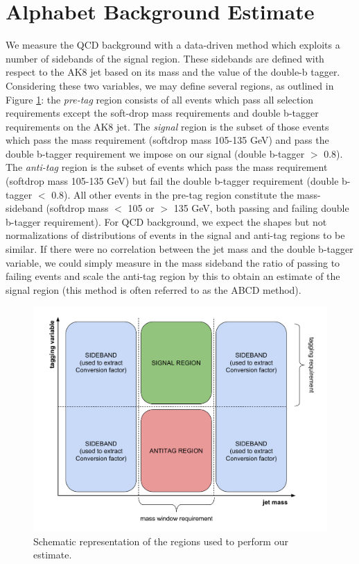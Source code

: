 \section{Alphabet Background Estimate\label{ss:Alphabet}}
We measure the QCD background with a data-driven method which exploits a number of sidebands of the signal region. These sidebands are defined with respect to the AK8 jet based on its mass and the value of the double-b tagger. Considering these two variables, we may define several regions, as outlined in Figure \ref{F:ABCDEFregions}: the \textit{pre-tag} region consists of all events which pass all selection requirements except the soft-drop mass requirements and double b-tagger requirements on the AK8 jet. The \textit{signal} region is the subset of those events which pass the mass requirement (softdrop mass 105-135 GeV) and pass the double b-tagger requirement we impose on our signal (double b-tagger $>$ 0.8). The \textit{anti-tag} region is the subset of events which pass the mass requirement (softdrop mass 105-135 GeV) but fail the double b-tagger requirement (double b-tagger $<$ 0.8). All other events in the pre-tag region constitute the mass-sideband (softdrop mass $<$ 105 or $>$ 135 GeV, both passing and failing double b-tagger requirement). For QCD background, we expect the shapes but not normalizations of distributions of events in the signal and anti-tag regions to be similar. If there were no correlation between the jet mass and the double b-tagger variable, we could simply measure in the mass sideband the ratio of passing to failing events and scale the anti-tag region by this to obtain an estimate of the signal region (this method is often referred to as the ABCD method).
\begin{figure}[h!]
  \centering
    \includegraphics[width=\textwidth]{F5/pretag2.pdf}
  \caption{Schematic representation of the regions used to perform our estimate.} \label{F:ABCDEFregions}
\end{figure}


